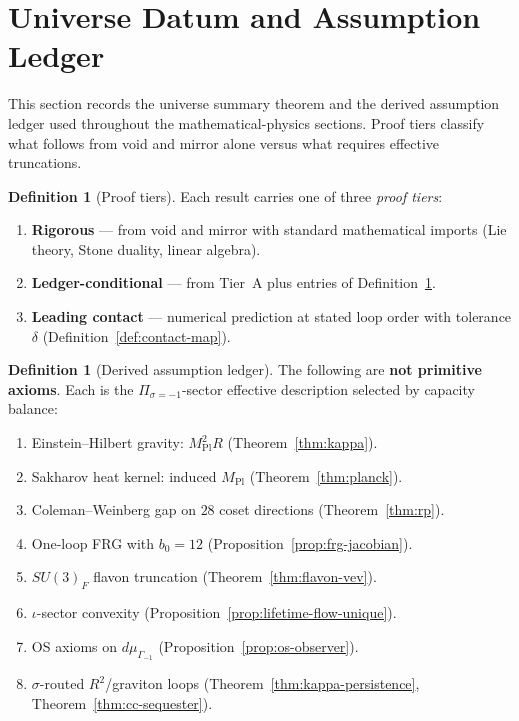\documentclass[11pt]{article}
\theoremstyle{plain}
\theoremstyle{definition}
\newtheorem{definition}[theorem]{Definition}
\theoremstyle{remark}
\numberwithin{equation}{section}
\newcommand{\MPl}{M_{\mathrm{Pl}}}
\begin{document}
\section{Universe Datum and Assumption Ledger}
\label{sec:derivation-complete}

This section records the universe summary theorem and the derived assumption
ledger used throughout the mathematical-physics sections. Proof tiers classify
what follows from void and mirror alone versus what requires effective
truncations.

\begin{definition}[Proof tiers]\label{def:proof-tiers}
Each result carries one of three \emph{proof tiers}:
\begin{enumerate}[label=\textbf{Tier~\Alph* :},leftmargin=*]
  \item \textbf{Rigorous} --- from void and mirror with standard mathematical
    imports (Lie theory, Stone duality, linear algebra).
  \item \textbf{Ledger-conditional} --- from Tier~A plus entries of
    Definition~\ref{def:assumption-ledger}.
  \item \textbf{Leading contact} --- numerical prediction at stated loop order
    with tolerance $\delta$ (Definition~\ref{def:contact-map}).
\end{enumerate}
\end{definition}

\begin{definition}[Derived assumption ledger]\label{def:assumption-ledger}
The following are \textbf{not primitive axioms}. Each is the
$\Pi_{\sigma=-1}$-sector effective description selected by capacity balance:
\begin{enumerate}[label=\textbf{A\arabic*},leftmargin=*]
  \item \label{asm:eh} Einstein--Hilbert gravity: $\MPl^2 R$
    (Theorem~\ref{thm:kappa}).
  \item \label{asm:sakharov} Sakharov heat kernel: induced $\MPl$
    (Theorem~\ref{thm:planck}).
  \item \label{asm:cw} Coleman--Weinberg gap on $28$ coset directions
    (Theorem~\ref{thm:rp}).
  \item \label{asm:frg} One-loop FRG with $b_0=12$
    (Proposition~\ref{prop:frg-jacobian}).
  \item \label{asm:flavon} $SU(3)_F$ flavon truncation
    (Theorem~\ref{thm:flavon-vev}).
  \item \label{asm:convex} $\iota$-sector convexity
    (Proposition~\ref{prop:lifetime-flow-unique}).
  \item \label{asm:os} OS axioms on $d\mu_{\Gamma_{-1}}$
    (Proposition~\ref{prop:os-observer}).
  \item \label{asm:grav-loops} $\sigma$-routed $R^2$/graviton loops
    (Theorem~\ref{thm:kappa-persistence}, Theorem~\ref{thm:cc-sequester}).
\end{enumerate}
\end{definition}
\end{document}
